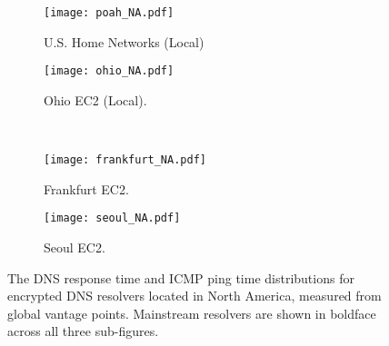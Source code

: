 \begin{figure*}[h!]
\centering
\begin{subfigure}[b]{0.35\textwidth}
\texttt{[image: poah\_NA.pdf]}
    \caption{U.S. Home Networks (Local)}
\end{subfigure}
%
\begin{subfigure}[b]{0.35\textwidth}
\texttt{[image: ohio\_NA.pdf]}
    \caption{Ohio EC2 (Local).}
\end{subfigure}
%
\hfill \\
\begin{subfigure}[b]{0.35\textwidth}
\texttt{[image: frankfurt\_NA.pdf]}
    \caption{Frankfurt EC2.}
\end{subfigure}
%
\begin{subfigure}[b]{0.35\textwidth}
\texttt{[image: seoul\_NA.pdf]}
\caption{Seoul EC2.}
\end{subfigure}
\caption{The DNS response time and ICMP ping time distributions for
    encrypted DNS resolvers located in North America, measured from global vantage points.
    Mainstream resolvers are shown in boldface across all three
    sub-figures.}
\label{fig:dns-NA}
\end{figure*}

